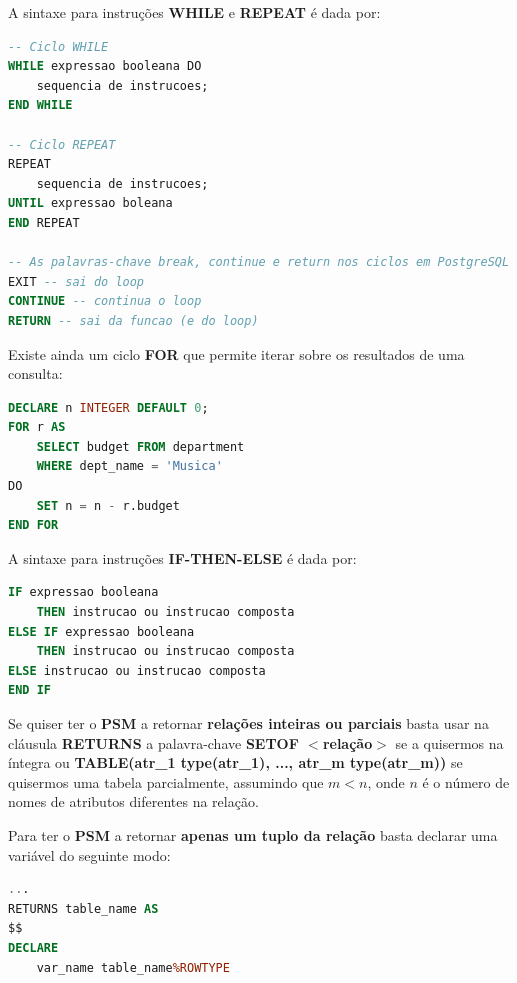\documentclass[oneside]{book}
\theoremstyle{definition}
\begin{document}
A sintaxe para instruções \textbf{WHILE} e \textbf{REPEAT} é dada por:
\begin{lstlisting}[language=SQL, morekeywords={CREATE, TYPE}, framesep=8pt, xleftmargin=40pt, framexleftmargin=40pt, frame=tb, framerule=0pt]
-- Ciclo WHILE
WHILE expressao booleana DO
    sequencia de instrucoes;
END WHILE

-- Ciclo REPEAT
REPEAT
    sequencia de instrucoes;
UNTIL expressao boleana
END REPEAT

-- As palavras-chave break, continue e return nos ciclos em PostgreSQL sao dados por
EXIT -- sai do loop
CONTINUE -- continua o loop
RETURN -- sai da funcao (e do loop)
\end{lstlisting}

Existe ainda um ciclo \textbf{FOR} que permite iterar sobre os resultados de uma consulta:
\begin{lstlisting}[language=SQL, morekeywords={DECLARE, FOR, DO}, framesep=8pt, xleftmargin=40pt, framexleftmargin=40pt, frame=tb, framerule=0pt]
DECLARE n INTEGER DEFAULT 0;
FOR r AS
    SELECT budget FROM department
    WHERE dept_name = 'Musica'
DO
    SET n = n - r.budget
END FOR
\end{lstlisting}

A sintaxe para instruções \textbf{IF-THEN-ELSE} é dada por:
\begin{lstlisting}[language=SQL, morekeywords={IF, DECLARE, FOR, DO}, framesep=8pt, xleftmargin=40pt, framexleftmargin=40pt, frame=tb, framerule=0pt]
IF expressao booleana
    THEN instrucao ou instrucao composta
ELSE IF expressao booleana
    THEN instrucao ou instrucao composta
ELSE instrucao ou instrucao composta
END IF
\end{lstlisting}

Se quiser ter o \textbf{PSM} a retornar \textbf{relações inteiras ou parciais} basta usar na cláusula \textbf{RETURNS} a palavra-chave \textbf{SETOF $<$relação$>$} se a quisermos na íntegra ou \textbf{TABLE(atr\_1 type(atr\_1), ..., atr\_m type(atr\_m))} se quisermos uma tabela parcialmente, assumindo que $m < n$, onde $n$ é o número de nomes de atributos diferentes na relação.

Para ter o \textbf{PSM} a retornar \textbf{apenas um tuplo da relação} basta declarar uma variável do seguinte modo:
\begin{lstlisting}[language=SQL, morekeywords={$$, RETURNS, DECLARE, ROWTYPE}, framesep=8pt, xleftmargin=40pt, framexleftmargin=40pt, frame=tb, framerule=0pt]
...
RETURNS table_name AS
$$
DECLARE
    var_name table_name%ROWTYPE
\end{lstlisting}
\end{document}
